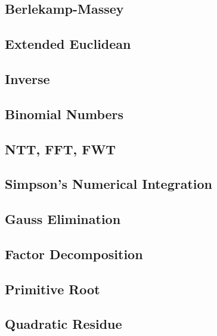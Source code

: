 \subsection{Berlekamp-Massey}
\raggedbottom
\hrulefill
\subsection{Extended Euclidean}
\raggedbottom
\hrulefill
\subsection{Inverse}
\raggedbottom
\hrulefill
\subsection{Binomial Numbers}
\raggedbottom
\hrulefill
\subsection{NTT, FFT, FWT}
\raggedbottom
\hrulefill
\subsection{Simpson's Numerical Integration}
\raggedbottom
\hrulefill
\subsection{Gauss Elimination}
\raggedbottom
\hrulefill
\subsection{Factor Decomposition}
\raggedbottom
\hrulefill
\subsection{Primitive Root}
\raggedbottom
\hrulefill
\subsection{Quadratic Residue}
\raggedbottom
\hrulefill
